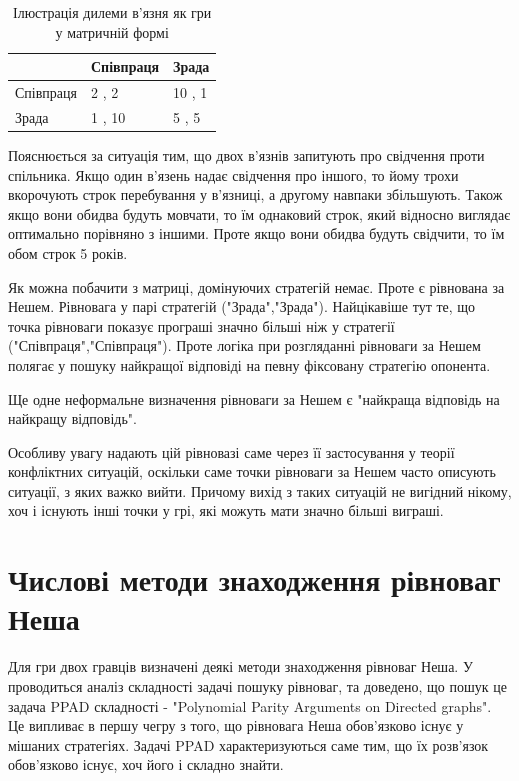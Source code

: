 \begin{table}[H]
	\caption{Ілюстрація дилеми в'язня як гри у матричній формі}
	\label{table:prisoners_dillema}
	\begin{center}
		\begin{tabular}{|l|l|l|}
			\hline
						& Співпраця & Зрада
			\\ \hline
			Співпраця 	& 2 , 2     & 10 , 1
			\\ \hline
			Зрада 		& 1 , 10    & 5 , 5
			\\ \hline
		\end{tabular}
	\end{center}
\end{table}

Пояснюється за ситуація тим, що двох в'язнів запитують про свідчення проти спільника. Якщо один в'язень надає свідчення про іншого, то йому трохи вкорочують строк перебування у в'язниці, а другому навпаки збільшують. Також якщо вони обидва будуть мовчати, то їм однаковий строк, який відносно виглядає оптимально порівняно з іншими. Проте якщо вони обидва будуть свідчити, то їм обом строк 5 років.

Як можна побачити з матриці, домінуючих стратегій немає. Проте є рівнована за Нешем. Рівновага у парі стратегій ("Зрада","Зрада"). Найцікавіше тут те, що точка рівноваги показує програші значно більші ніж у стратегії ("Співпраця","Співпраця"). Проте логіка при розгляданні рівноваги за Нешем полягає у пошуку найкращої відповіді на певну фіксовану стратегію опонента.

Ще одне неформальне визначення рівноваги за Нешем є "найкраща відповідь на найкращу відповідь".

Особливу увагу надають цій рівновазі саме через її застосування у теорії конфліктних ситуацій, оскільки саме точки рівноваги за Нешем часто описують ситуації, з яких важко вийти. Причому вихід з таких ситуацій не вигідний нікому, хоч і існують інші точки у грі, які можуть мати значно більші виграші.

\section{Числові методи знаходження рівноваг Неша}

Для гри двох гравців визначені деякі методи знаходження рівноваг Неша. У \cite{NashComplexity} проводиться аналіз складності задачі пошуку рівноваг, та доведено, що пошук це задача PPAD складності - "Polynomial Parity Arguments on Directed graphs". Це випливає в першу чегру з того, що рівновага Неша обов'язково існує у мішаних стратегіях. Задачі PPAD характеризуються саме тим, що їх розв'язок обов'язково існує, хоч його і складно знайти.

